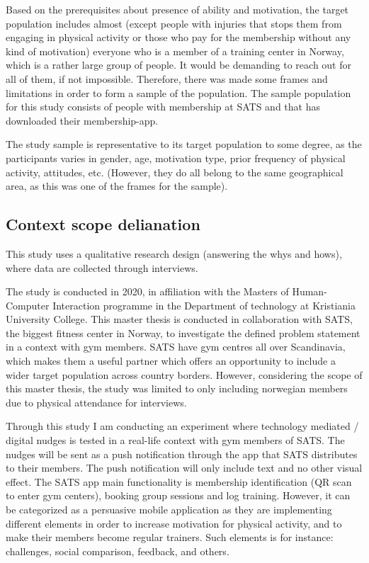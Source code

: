 
Based on the prerequisites about presence of ability and motivation, the target population includes almost (except people with injuries that stops them from engaging in physical activity or those who pay for the membership without any kind of motivation) everyone who is a member of a training center in Norway, which is a rather large group of people. It would be demanding to reach out for all of them, if not impossible. Therefore, there was made some frames and limitations in order to form a sample of the population. The sample population for this study consists of people with membership at SATS and that has downloaded their membership-app. 
 
The study sample is representative to its target population to some degree, as the participants varies in gender, age, motivation type, prior frequency of physical activity, attitudes, etc. (However, they do all belong to the same geographical area, as this was one of the frames for the sample).
 
\subsection{Context scope delianation }
This study uses a qualitative research design (answering the whys and hows), where data are collected through interviews. 

The study is conducted in 2020, in affiliation with the Masters of Human-Computer Interaction programme in the Department of technology at Kristiania University College. This master thesis is conducted in collaboration with SATS, the biggest fitness center in Norway, to investigate the defined problem statement in a context with gym members. SATS have gym centres all over Scandinavia, which makes them a useful partner which offers an opportunity to include a wider target population across country borders. However, considering the scope of this master thesis, the study was limited to only including norwegian members due to physical attendance for interviews. 

Through this study I am conducting an experiment where technology mediated / digital nudges is tested in a real-life context with gym members of SATS. The nudges will be sent as a push notification through the app that SATS distributes to their members. The push notification will only include text and no other visual effect. The SATS app main functionality is membership identification (QR scan to enter gym centers), booking group sessions and log training. However, it can be categorized as a persuasive mobile application as they are implementing different elements in order to increase motivation for physical activity, and to make their members become regular trainers. Such elements is for instance: challenges, social comparison, feedback, and others. 

